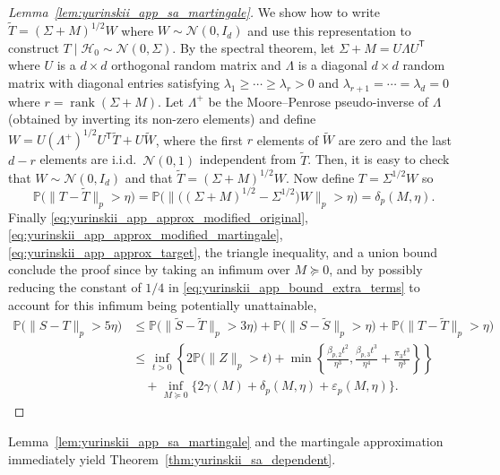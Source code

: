 \documentclass[11pt,lof]{puthesis}
\renewcommand{\P}{\ensuremath{\mathbb{P}}}
\newcommand{\cH}{\ensuremath{\mathcal{H}}}
\newcommand{\cN}{\ensuremath{\mathcal{N}}}
\newcommand{\T}{\ensuremath{\mathsf{T}}}
\DeclareMathOperator{\rank}{rank}
\theoremstyle{break}
\theoremstyle{proof}
\newtheorem{proof}{Proof}
\begin{document}
\begin{proof}[Lemma~\ref{lem:yurinskii_app_sa_martingale}]
  We show how to write
  $\tilde T = (\Sigma + M)^{1/2} W$
  where $W \sim \cN(0,I_d)$
  and use this representation to construct
  $T \mid \cH_0 \sim \cN(0, \Sigma)$.
  By the spectral theorem, let $\Sigma + M = U \Lambda U^\T$
  where $U$ is a $d \times d$ orthogonal random matrix
  and $\Lambda$ is a diagonal $d \times d$ random matrix with
  diagonal entries satisfying
  $\lambda_1 \geq \cdots \geq \lambda_r > 0$
  and $\lambda_{r+1} = \cdots = \lambda_d = 0$
  where $r = \rank (\Sigma + M)$.
  Let $\Lambda^+$ be the Moore--Penrose pseudo-inverse of $\Lambda$
  (obtained by inverting its non-zero elements) and define
  $W = U (\Lambda^+)^{1/2} U^\T \tilde T + U \tilde W$, where
  the first $r$ elements of $\tilde W$ are zero
  and the last $d-r$ elements are i.i.d.\ $\cN(0,1)$
  independent from $\tilde T$.
  Then, it is easy to check that
  $W \sim \cN(0, I_d)$ and that
  $\tilde T = (\Sigma + M)^{1/2} W$.
  Now define $T = \Sigma^{1/2} W$ so
  \begin{equation}%
    \label{eq:yurinskii_app_approx_target}
    \P\big(\|T - \tilde T\|_p > \eta\big)
    = \P\big(\big\|\big((\Sigma + M)^{1/2}
    - \Sigma^{1/2} \big) W \big\|_p>\eta \big)
    = \delta_p(M, \eta).
  \end{equation}
  Finally
  \eqref{eq:yurinskii_app_approx_modified_original},
  \eqref{eq:yurinskii_app_approx_modified_martingale},
  \eqref{eq:yurinskii_app_approx_target},
  the triangle inequality,
  and a union bound conclude the proof since
  by taking an infimum over $M \succeq 0$,
  and by possibly reducing the constant of $1/4$ in
  \eqref{eq:yurinskii_app_bound_extra_terms} to account for
  this infimum being potentially unattainable,
  \begin{align*}
    \P\big(\|S-T\|_p > 5\eta\big)
    &\leq
    \P\big(\|\tilde S - \tilde T \|_p > 3\eta \big)
    +\P\big(\|S - \tilde S \|_p > \eta\big)
    +\P\big(\|T - \tilde T \|_p > \eta\big) \\
    &\leq
    \inf_{t>0}
    \left\{
      2 \P\big( \|Z\|_p > t \big)
      + \min\left\{
        \frac{\beta_{p,2} t^2}{\eta^3},
        \frac{\beta_{p,3} t^3}{\eta^4}
        + \frac{\pi_3 t^3}{\eta^3}
      \right\}
    \right\} \\
    &\quad+
    \inf_{M \succeq 0}
    \big\{ 2\gamma(M) + \delta_p(M,\eta)
    + \varepsilon_p(M, \eta)\big\}.
  \end{align*}
\end{proof}

Lemma~\ref{lem:yurinskii_app_sa_martingale} and the martingale approximation
immediately yield Theorem~\ref{thm:yurinskii_sa_dependent}.
\end{document}

